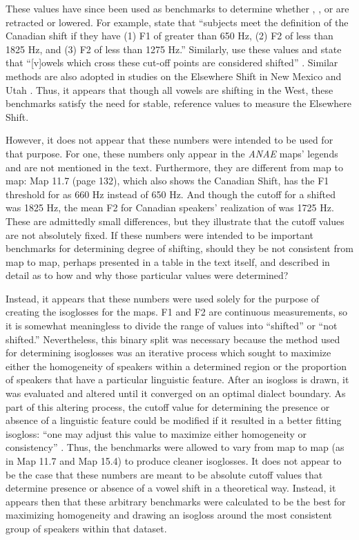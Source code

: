 These values have since been used as benchmarks to determine whether \lot, \trap, or \dress are retracted or lowered. For example, \citet[44]{kennedy_grama_2012} state that ``subjects meet the definition of the Canadian shift if they have (1) F1 of \dress greater than 650 Hz, (2) F2 of \trap less than 1825 Hz, and (3) F2 of \lot less than 1275 Hz.'' Similarly, \citeauthor{becker_etal_2016_pads} use these values and state that ``[v]owels which cross these cut-off points are considered shifted'' \citeyearpar[113]{becker_etal_2016_pads}. Similar methods are also adopted in studies on the Elsewhere Shift in New Mexico \citep{brumbaugh_koops_2017_pads} and Utah \citet{bowie_2017_pads}. Thus, it appears that though all vowels are shifting in the West, these benchmarks satisfy the need for stable, reference values to measure the Elsewhere Shift.

However, it does not appear that these numbers were intended to be used for that purpose. For one, these numbers only appear in the \textit{ANAE} maps' legends and are not mentioned in the text. Furthermore, they are different from map to map: Map 11.7 (page 132), which also shows the Canadian Shift, has the F1 threshold for \dress as 660 Hz instead of 650 Hz. And though the cutoff for a shifted \trap was 1825 Hz, the mean F2 for Canadian speakers’ realization of \trap was 1725 Hz. These are admittedly small differences, but they illustrate that the cutoff values are not absolutely fixed. If these numbers were intended to be important benchmarks for determining degree of shifting, should they be not consistent from map to map, perhaps presented in a table in the text itself, and described in detail as to how and why those particular values were determined?

Instead, it appears that these numbers were used solely for the purpose of creating the isoglosses for the maps. F1 and F2 are continuous measurements, so it is somewhat meaningless to divide the range of values into ``shifted'' or ``not shifted.'' Nevertheless, this binary split was necessary because the method used for determining isoglosses was an iterative process which sought to maximize either the homogeneity of speakers within a determined region or the proportion of speakers that have a particular linguistic feature. After an isogloss is drawn, it was evaluated and altered until it converged on an optimal dialect boundary. As part of this altering process, the cutoff value for determining the presence or absence of a linguistic feature could be modified if it resulted in a better fitting isogloss: ``one may adjust this value to maximize either homogeneity or consistency'' \citep[43]{labov_ash_boberg_2006_anae}. Thus, the benchmarks were allowed to vary from map to map (as in Map 11.7 and Map 15.4) to produce cleaner isoglosses. It does not appear to be the case that these numbers are meant to be absolute cutoff values that determine presence or absence of a vowel shift in a theoretical way. Instead, it appears then that these arbitrary benchmarks were calculated to be the best for maximizing homogeneity and drawing an isogloss around the most consistent group of speakers within that dataset.

